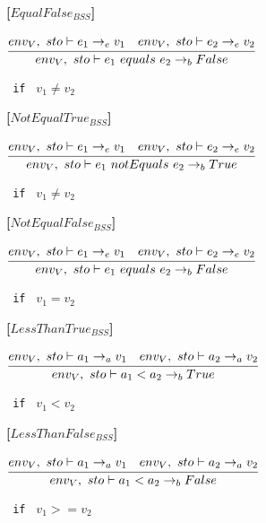 \textbf{[$EqualFalse_{BSS}$]}\\
\begin{center}
	\begin{math}
	\cfrac
	{env_V,\ sto \vdash e_1 \rightarrow_e v_1 \quad env_V,\ sto \vdash e_2 \rightarrow_e v_2}
	{env_V,\ sto \vdash e_1\ equals\ e_2 \rightarrow_b False}
	\end{math}
	
	\texttt{ if } $v_1 \neq v_2$
\end{center}

\textbf{[$NotEqualTrue_{BSS}$]}\\
\begin{center}
	\begin{math}
	\cfrac
	{env_V,\ sto \vdash e_1 \rightarrow_e v_1 \quad env_V,\ sto \vdash e_2 \rightarrow_e v_2}
	{env_V,\ sto \vdash e_1\ notEquals\ e_2 \rightarrow_b True}
	\end{math}
	
	\texttt{ if } $v_1 \neq v_2$
\end{center}

\textbf{[$NotEqualFalse_{BSS}$]}\\
\begin{center}
	\begin{math}
	\cfrac
	{env_V,\ sto \vdash e_1 \rightarrow_e v_1 \quad env_V,\ sto \vdash e_2 \rightarrow_e v_2}
	{env_V,\ sto \vdash e_1\ equals\ e_2 \rightarrow_b False}
	\end{math}
	
	\texttt{ if } $v_1 = v_2$
\end{center}

\textbf{[$LessThanTrue_{BSS}$]}\\
\begin{center}
	\begin{math}
	\cfrac
	{env_V,\ sto \vdash a_1 \rightarrow_a v_1 \quad env_V,\ sto \vdash a_2 \rightarrow_a v_2}
	{env_V,\ sto \vdash a_1 < a_2 \rightarrow_b True}
	\end{math}
	
	\texttt{ if } $v_1 < v_2$
\end{center}

\textbf{[$LessThanFalse_{BSS}$]}\\
\begin{center}
	\begin{math}
	\cfrac
	{env_V,\ sto \vdash a_1 \rightarrow_a v_1 \quad env_V,\ sto \vdash a_2 \rightarrow_a v_2}
	{env_V,\ sto \vdash a_1 < a_2 \rightarrow_b False}
	\end{math}
	
	\texttt{ if } $v_1 >= v_2$
\end{center}

